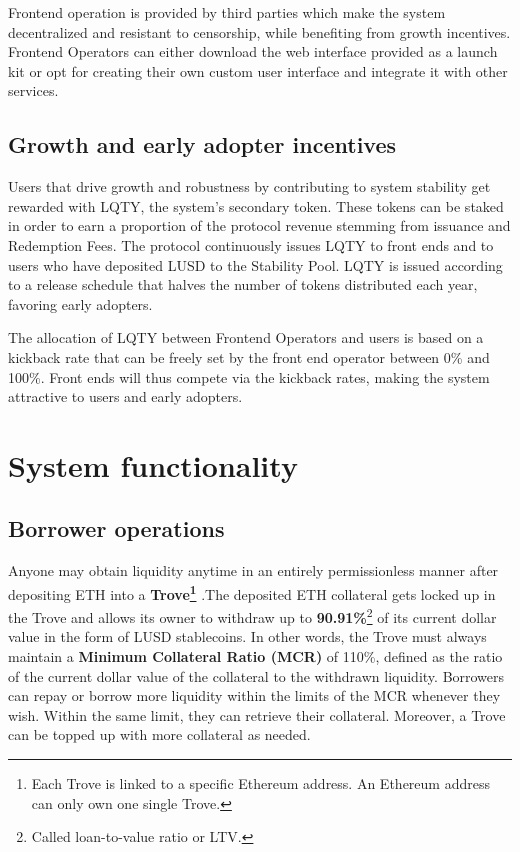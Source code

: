 \documentclass{article}
\begin{document}
Frontend operation is provided by third parties which make the system decentralized and resistant to censorship, while benefiting from growth incentives. Frontend Operators can either download the web interface provided as a launch kit or opt for creating their own custom user interface and integrate it with other services.

\subsection{Growth and early adopter incentives}
Users that drive growth and robustness by contributing to system stability get rewarded with LQTY, the system's secondary token. These tokens can be staked in order to earn a proportion of the protocol revenue stemming from issuance and Redemption Fees. The protocol continuously issues LQTY to front ends and to users who have deposited LUSD to the Stability Pool. LQTY is issued according to a release schedule that halves the number of tokens distributed each year, favoring early adopters.

The allocation of LQTY between Frontend Operators and users is based on a kickback rate that can be freely set by the front end operator between 0\% and 100\%. Front ends will thus compete via the kickback rates, making the system attractive to users and early adopters.

\section{System functionality}
\subsection{Borrower operations }
Anyone may obtain liquidity anytime in an entirely permissionless manner after depositing ETH into a \textbf{Trove\footnote{Each Trove is linked to a specific Ethereum address. An Ethereum address can only own one single Trove.} }.The deposited ETH collateral gets locked up in the Trove and allows its owner to withdraw up to \textbf{90.91\%}\footnote{Called loan-to-value ratio or LTV.} of its current dollar value in the form of LUSD stablecoins. In other words, the Trove must always maintain a \textbf{Minimum Collateral Ratio (MCR)} of 110\%, defined as the ratio of the current dollar value of the collateral to the withdrawn liquidity. Borrowers can repay or borrow more liquidity within the limits of the MCR whenever they wish. Within the same limit, they can retrieve their collateral. Moreover, a Trove can be topped up with more collateral as needed. 
\end{document}

